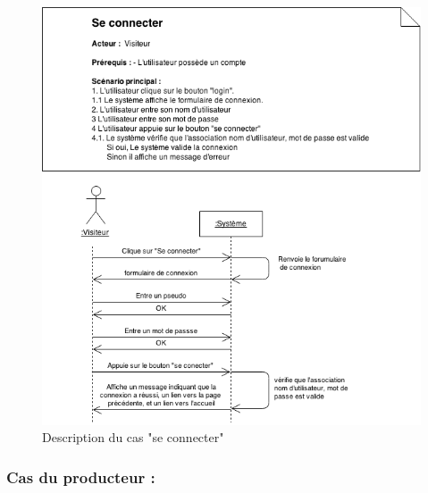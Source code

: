 \documentclass[12pt]{report}
\begin{document}
\begin{figure}[!H]
\centering
\includegraphics[width=1.\textwidth]{./ressources/desc_UC_connecter.png}
\caption{Description du cas "se connecter"}
\end{figure}
\clearpage

\subsubsection{Cas du producteur :}
\end{document}
